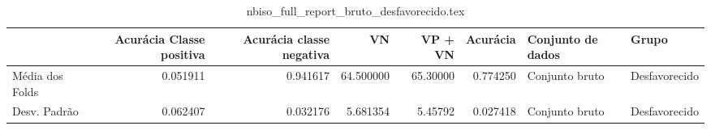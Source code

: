 \begin{table}
\centering
\caption{nbiso_full_report_bruto_desfavorecido.tex}
\label{nbiso_full_report_bruto_desfavorecido.tex}
\begin{tabular}{lrrrrrll}
\toprule
{}              &  Acurácia Classe positiva &  Acurácia classe negativa &        VN  &  VP + VN  &  Acurácia & Conjunto de dados &          Grupo \\
\midrule
Média dos Folds &                  0.051911 &                  0.941617 &  64.500000 &  65.30000 &  0.774250 &    Conjunto bruto &  Desfavorecido \\
Desv. Padrão    &                  0.062407 &                  0.032176 &   5.681354 &   5.45792 &  0.027418 &    Conjunto bruto &  Desfavorecido \\
\bottomrule
\end{tabular}
\end{table}
